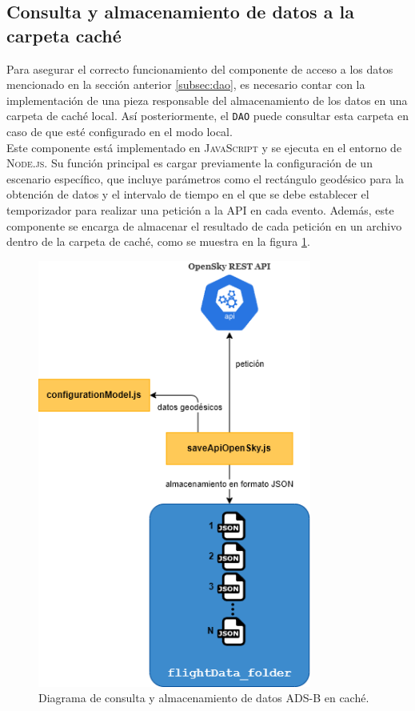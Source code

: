 \documentclass[a4paper, 11pt]{book}
\begin{document}
\subsection{Consulta y almacenamiento de datos a la carpeta caché}
\label{subsec:obtencionCache}
Para asegurar el correcto funcionamiento del componente de acceso a los datos mencionado en la sección anterior \ref{subsec:dao}, es necesario contar con la implementación de una pieza responsable del almacenamiento de los datos en una carpeta de caché local. Así posteriormente, el \texttt{DAO} puede consultar esta carpeta en caso de que esté configurado en el modo local.\\
Este componente está implementado en \textsc{JavaScript} y se ejecuta en el entorno de \textsc{Node.js}. Su función principal es cargar previamente la configuración de un escenario específico, que incluye parámetros como el rectángulo geodésico para la obtención de datos y el intervalo de tiempo en el que se debe establecer el temporizador para realizar una petición a la \textsc{API} en cada evento. Además, este componente se encarga de almacenar el resultado de cada petición en un archivo dentro de la carpeta de caché, como se muestra en la figura \ref{fig:saveApiData}.
\begin{figure}[h]
  \centering
  \includegraphics[width=9cm, keepaspectratio]{img/almacenamientoCache.drawio.png}
  \caption{Diagrama de consulta y almacenamiento de datos ADS-B en caché.}
  \label{fig:saveApiData}
\end{figure}
\end{document}
